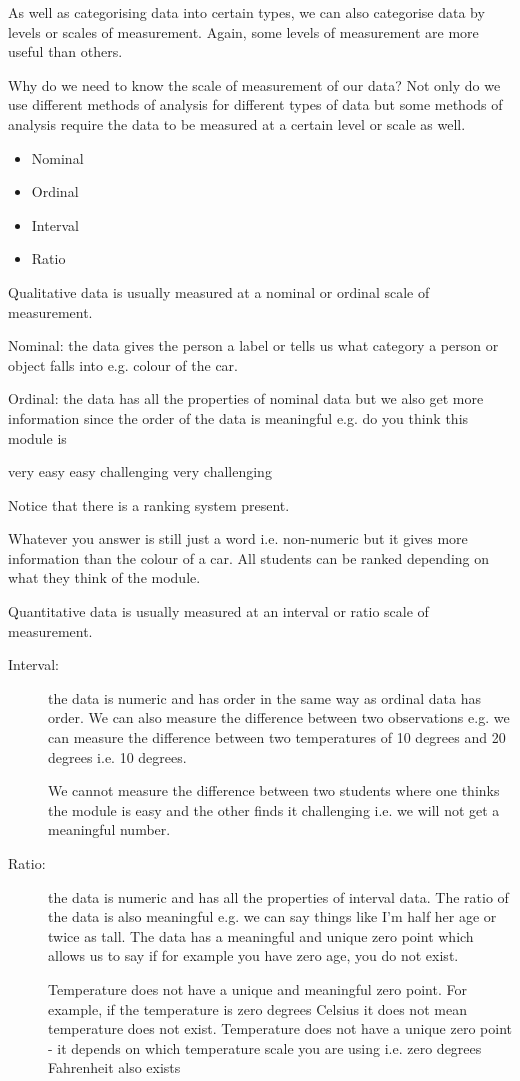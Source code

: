 \documentclass[12pt, a4paper]{report}
\theoremstyle{definition}
\theoremstyle{remark}
\begin{document}
As well as categorising data into certain types, we can also categorise data by levels or scales of measurement. Again, some levels of measurement are more useful than others. 

Why do we need to know the scale of measurement of our data? Not only do we use different methods of analysis for different types of data but some methods of analysis require the data to be measured at a certain level or scale as well.


\begin{itemize}
\item	Nominal 
\item	Ordinal
\item	Interval
\item	Ratio
\end{itemize}


Qualitative data is usually measured at a nominal or ordinal scale of measurement. 

Nominal: the data gives the person a label or tells us what category a person or object falls into e.g. colour of the car. 

Ordinal: the data has all the properties of nominal data but we also get more information since the order of the data is meaningful e.g. do you think this module is

very easy 	easy 		challenging		very challenging


Notice that there is a ranking system present.

Whatever you answer is still just a word i.e. non-numeric but it gives more information than the colour of a car. All students can be ranked depending on what they think of the module.


Quantitative data is usually measured at an interval or ratio scale of measurement.

\begin{description}
\item[Interval:] the data is numeric and has order in the same way as ordinal data has order. We can also measure the difference between two observations e.g. we can measure the difference between two temperatures of 10 degrees and 20 degrees i.e. 10 degrees. 

We cannot measure the difference between two students where one thinks the module is easy and the other finds it challenging i.e. we will not get a meaningful number.

\item[Ratio:] the data is numeric and has all the properties of interval data. The ratio of the data is also meaningful e.g. we can say things like I’m half her age or twice as tall. The data has a meaningful and unique zero point which allows us to say if for example you have zero age, you do not exist. 

Temperature does not have a unique and meaningful zero point. For example, if the temperature is zero degrees Celsius it does not mean temperature does not exist. Temperature does not have a unique zero point - it depends on which temperature scale you are using i.e. zero degrees Fahrenheit also exists
\end{description}
\end{document}

